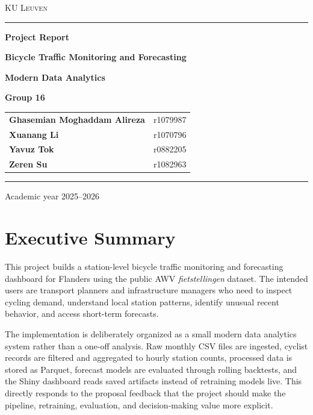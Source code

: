 \documentclass[11pt]{article}
\newcommand{\projecttitle}{Bicycle Traffic Monitoring and Forecasting}
\begin{document}

\begin{titlepage}
    \centering
    {\small\scshape KU Leuven \par}
    \vspace{1em}
    {\color{MidnightBlue}\rule{0.86\textwidth}{1.1pt}\par}
    \vspace{1.4em}
    {\Huge\bfseries Project Report\par}
    \vspace{0.65em}
    {\LARGE\bfseries \projecttitle\par}
    \vspace{1.1em}
    {\large\color{MidnightBlue}\textbf{Modern Data Analytics}\par}
    \vspace{1.4em}
    {\large\textbf{Group 16}\par}
    \vspace{1em}
    {\large
    \begin{tabular}{>{\bfseries}ll}
        Ghasemian Moghaddam Alireza & r1079987 \\
        Xuanang Li & r1070796 \\
        Yavuz Tok & r0882205 \\
        Zeren Su & r1082963 \\
    \end{tabular}
    \par}
    \vfill
    {\color{MidnightBlue}\rule{0.86\textwidth}{0.9pt}\par}
    \vspace{0.6em}
    {\small Academic year 2025--2026\par}
\end{titlepage}


\section{Executive Summary}

This project builds a station-level bicycle traffic monitoring and forecasting dashboard for Flanders using the public AWV \emph{fietstellingen} dataset. The intended users are transport planners and infrastructure managers who need to inspect cycling demand, understand local station patterns, identify unusual recent behavior, and access short-term forecasts.

The implementation is deliberately organized as a small modern data analytics system rather than a one-off analysis. Raw monthly CSV files are ingested, cyclist records are filtered and aggregated to hourly station counts, processed data is stored as Parquet, forecast models are evaluated through rolling backtests, and the Shiny dashboard reads saved artifacts instead of retraining models live. This directly responds to the proposal feedback that the project should make the pipeline, retraining, evaluation, and decision-making value more explicit.
\end{document}
